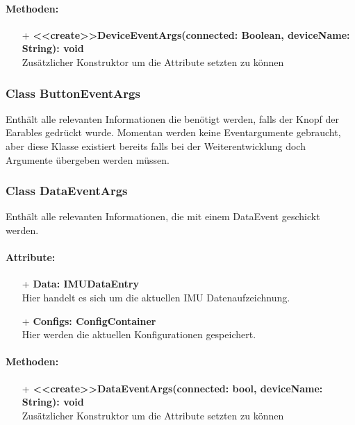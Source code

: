 \documentclass[a4paper,12pt]{article}
\begin{document}
\paragraph{Methoden:}
\begin{itemize}
	\item[+] \textbf{<<create>>DeviceEventArgs(connected: Boolean, deviceName: String): void}\\ Zusätzlicher Konstruktor um die Attribute setzten zu können
\end{itemize}


\subsubsection{Class ButtonEventArgs}
Enthält alle relevanten Informationen die benötigt werden, falls der Knopf der \Gls{Earables} gedrückt wurde. Momentan werden keine Eventargumente gebraucht, aber diese Klasse existiert bereits falls bei der Weiterentwicklung doch Argumente übergeben werden müssen.


\subsubsection{Class DataEventArgs}
Enthält alle relevanten Informationen, die mit einem DataEvent geschickt werden.

\paragraph{Attribute:}
\begin{itemize}
	\item[+] \textbf{Data: IMUDataEntry}\\Hier handelt es sich um die aktuellen IMU Datenaufzeichnung.
	\item[+] \textbf{Configs: ConfigContainer}\\Hier werden die aktuellen Konfigurationen gespeichert.
\end{itemize}

\paragraph{Methoden:}
\begin{itemize}
	\item[+] \textbf{<<create>>DataEventArgs(connected: bool, deviceName: String): void}\\ Zusätzlicher Konstruktor um die Attribute setzten zu können
\end{itemize}
\end{document}
